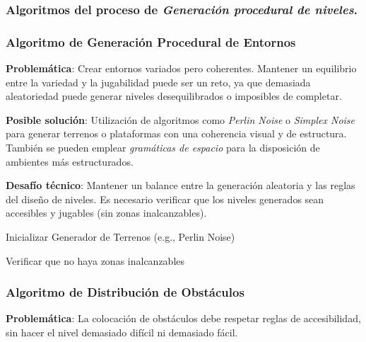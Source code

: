 \subsubsection{Algoritmos del proceso de \textit{Generación procedural de niveles}.}


\subsubsection*{Algoritmo de Generación Procedural de Entornos}

\textbf{Problemática}: Crear entornos variados pero coherentes. Mantener un equilibrio entre la variedad y la jugabilidad puede ser un reto, ya que demasiada aleatoriedad puede generar niveles desequilibrados o imposibles de completar.

\textbf{Posible solución}: Utilización de algoritmos como \textit{Perlin Noise} o \textit{Simplex Noise} para generar terrenos o plataformas con una coherencia visual y de estructura. También se pueden emplear \textit{gramáticas de espacio} para la disposición de ambientes más estructurados.

\textbf{Desafío técnico}: Mantener un balance entre la generación aleatoria y las reglas del diseño de niveles. Es necesario verificar que los niveles generados sean accesibles y jugables (sin zonas inalcanzables).

\begin{algorithm}
\caption{Inicializar Generador de Terrenos (e.g., Perlin Noise)\;}
\SetAlgoLined
{}
Verificar que no haya zonas inalcanzables\;
\end{algorithm}

\subsubsection*{Algoritmo de Distribución de Obstáculos}

\textbf{Problemática}: La colocación de obstáculos debe respetar reglas de accesibilidad, sin hacer el nivel demasiado difícil ni demasiado fácil.

